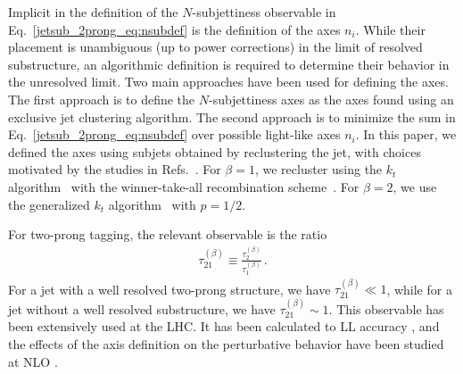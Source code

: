 \documentclass[11pt]{cernrep}
\begin{document}
Implicit in the definition of the $N$-subjettiness observable in
Eq.~\ref{jetsub_2prong_eq:nsubdef} is the definition of the axes $n_i$.
%
While their
placement is unambiguous (up to power corrections) in the limit of resolved substructure, an algorithmic definition is required to
determine their behavior in the unresolved limit.
%
Two main approaches
have been used for defining the axes.
%
The first approach is to define
the $N$-subjettiness axes as the axes found using an exclusive jet
clustering algorithm. The second approach is to minimize the sum in
Eq.~\ref{jetsub_2prong_eq:nsubdef} over possible light-like axes $n_i$.
%
In this paper, we defined the axes using subjets obtained by reclustering the jet, with choices motivated by the studies in Refs.~\cite{Stewart:2015waa,Dasgupta:2015lxh}.
%
For $\beta = 1$, we recluster using the $k_t$ algorithm~\cite{Catani:1993hr} with the
  winner-take-all recombination scheme~\cite{Larkoski:2014uqa}.
%
For $\beta = 2$, we use the generalized $k_t$ algorithm~\cite{Cacciari:2011ma} with $p=1/2$.

For two-prong tagging, the relevant observable is the ratio \cite{Thaler:2010tr}
\begin{align}
\tau_{21}^{(\beta)}\equiv \frac{\tau_{2}^{(\beta)}}{\tau_{1}^{(\beta)}}\,.
\end{align}
For a jet with a well resolved two-prong structure, we have $\tau_{21}^{(\beta)}\ll 1$, while for a jet without a well resolved substructure, we have $\tau_{21}^{(\beta)}\sim 1$.
%
This observable has been extensively used at the LHC.
%
It has been calculated to LL accuracy \cite{Dasgupta:2015lxh}, and the effects of the axis definition on the perturbative behavior have been studied at NLO \cite{Larkoski:2015uaa}.
\end{document}
